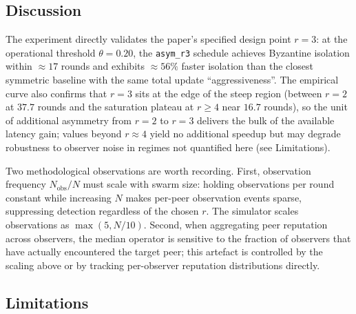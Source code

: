 \documentclass[journal,10pt,twocolumn]{IEEEtran}
\begin{document}
\subsection{Discussion}

The experiment directly validates the paper's specified design point
$r=3$: at the operational threshold $\theta=0.20$, the
\texttt{asym\_r3} schedule achieves Byzantine isolation within
$\approx 17$ rounds and exhibits $\approx 56\%$ faster isolation than
the closest symmetric baseline with the same total update
``aggressiveness''. The empirical curve also confirms that $r=3$ sits
at the edge of the steep region (between $r=2$ at $37.7$ rounds and
the saturation plateau at $r\geq 4$ near $16.7$ rounds), so the unit
of additional asymmetry from $r=2$ to $r=3$ delivers the bulk of the
available latency gain; values beyond $r\approx 4$ yield no additional
speedup but may degrade robustness to observer noise in regimes not
quantified here (see Limitations).

Two methodological observations are worth recording. First, observation
frequency $N_\text{obs}/N$ must scale with swarm size: holding
observations per round constant while increasing $N$ makes per-peer
observation events sparse, suppressing detection regardless of the
chosen $r$. The simulator scales observations as $\max(5, N/10)$.
Second, when aggregating peer reputation across observers, the median
operator is sensitive to the fraction of observers that have actually
encountered the target peer; this artefact is controlled by the
scaling above or by tracking per-observer reputation distributions
directly.

\subsection{Limitations}
\end{document}
